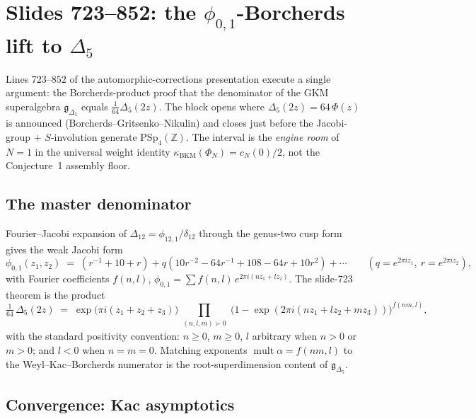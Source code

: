 
\providecommand{\LII}{\Lambda^{2,1}_{\mathrm{II}}}
\providecommand{\Dfive}{\Delta_5}
\providecommand{\phizo}{\phi_{0,1}}
\providecommand{\kBKM}{\kappa_{\mathrm{BKM}}}
\providecommand{\kch}{\kappa_{\mathrm{ch}}}
\providecommand{\gDfive}{\mathfrak{g}_{\Dfive}}

\section*{Slides 723--852: the $\phizo$-Borcherds lift to $\Dfive$}

Lines $723$--$852$ of the automorphic-corrections presentation execute a
single argument: the Borcherds-product proof that the denominator of the
GKM superalgebra $\gDfive$ equals $\tfrac{1}{64}\Dfive(2z)$. The block
opens where $\Dfive(2z) = 64\,\Phi(z)$ is announced (Borcherds--Gritsenko--Nikulin) and
closes just before the Jacobi-group + $S$-involution generate
$\mathrm{PSp}_4(\mathbb{Z})$. The interval is the \emph{engine room} of
$N=1$ in the universal weight identity $\kBKM(\Phi_N) = c_N(0)/2$, not
the Conjecture~1 assembly floor.

\subsection*{The master denominator}

Fourier--Jacobi expansion of $\Delta_{12} = \phi_{12,1}/\delta_{12}$ through the
genus-two cusp form gives the weak Jacobi form
\[
  \phizo(z_1, z_2) \;=\; (r^{-1} + 10 + r) + q(10r^{-2} - 64 r^{-1} + 108 - 64 r + 10 r^2) + \cdots
  \qquad (q = e^{2\pi i z_1},\ r = e^{2\pi i z_2}),
\]
with Fourier coefficients $f(n, l)$, $\phizo = \sum f(n,l)\,e^{2\pi i (n z_1 + l z_2)}$.
The slide-723 theorem is the product
\[
  \tfrac{1}{64}\,\Dfive(2z) \;=\; \exp\!\big(\pi i (z_1 + z_2 + z_3)\big)
  \prod_{\substack{(n,l,m) \succ 0}} \big(1 - \exp(2\pi i (n z_1 + l z_2 + m z_3))\big)^{f(nm, l)},
\]
with the standard positivity convention: $n \geq 0$, $m \geq 0$, $l$ arbitrary
when $n > 0$ or $m > 0$; and $l < 0$ when $n = m = 0$. Matching exponents
$\operatorname{mult} \alpha = f(nm, l)$ to the Weyl--Kac--Borcherds numerator is
the root-superdimension content of $\gDfive$.

\subsection*{Convergence: Kac asymptotics}

